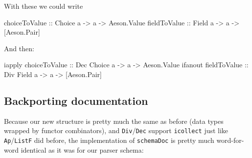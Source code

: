 \documentclass[]{article}
\newenvironment{Shaded}{}{}
\newcommand{\DataTypeTok}[1]{\textcolor[rgb]{0.56,0.13,0.00}{#1}}
\newcommand{\NormalTok}[1]{#1}
\newcommand{\OtherTok}[1]{\textcolor[rgb]{0.00,0.44,0.13}{#1}}
\begin{document}
With these we could write

\begin{Shaded}
\begin{Highlighting}[]
\OtherTok{choiceToValue ::} \DataTypeTok{Choice}\NormalTok{ a }\OtherTok{{-}>}\NormalTok{ a }\OtherTok{{-}>} \DataTypeTok{Aeson.Value}
\OtherTok{fieldToValue  ::} \DataTypeTok{Field}\NormalTok{ a  }\OtherTok{{-}>}\NormalTok{ a }\OtherTok{{-}>}\NormalTok{ [}\DataTypeTok{Aeson.Pair}\NormalTok{]}
\end{Highlighting}
\end{Shaded}

And then:

\begin{Shaded}
\begin{Highlighting}[]
\NormalTok{iapply}\OtherTok{ choiceToValue ::} \DataTypeTok{Dec} \DataTypeTok{Choice}\NormalTok{ a }\OtherTok{{-}>}\NormalTok{ a }\OtherTok{{-}>} \DataTypeTok{Aeson.Value}
\NormalTok{ifanout}\OtherTok{ fieldToValue ::} \DataTypeTok{Div} \DataTypeTok{Field}\NormalTok{  a }\OtherTok{{-}>}\NormalTok{ a }\OtherTok{{-}>}\NormalTok{ [}\DataTypeTok{Aeson.Pair}\NormalTok{]}
\end{Highlighting}
\end{Shaded}

\hypertarget{backporting-documentation-1}{%
\subsection{Backporting documentation}\label{backporting-documentation-1}}

Because our new structure is pretty much the same as before (data types wrapped
by functor combinators), and \texttt{Div}/\texttt{Dec} support \texttt{icollect}
just like \texttt{Ap}/\texttt{ListF} did before, the implementation of
\texttt{schemaDoc} is pretty much word-for-word identical as it was for our
parser schema:
\end{document}
